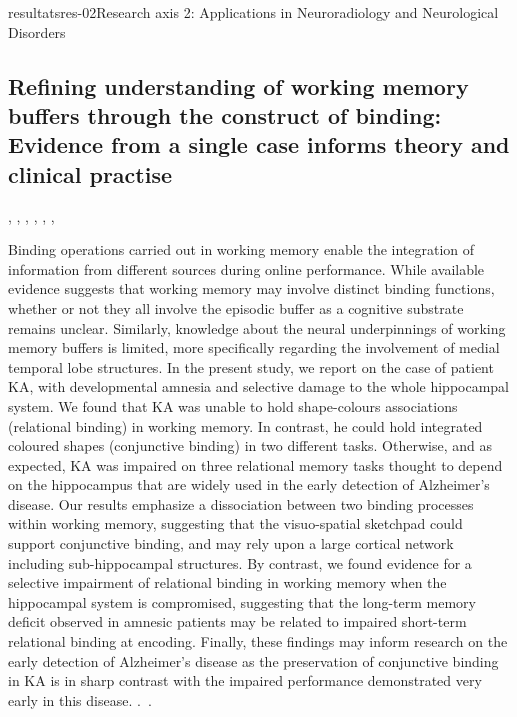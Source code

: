 \documentclass{ra2018}
\begin{document}
\begin{module}{resultats}{res-02}{Research axis 2: Applications in Neuroradiology and Neurological Disorders}
\subsection{Refining understanding of working memory buffers through the construct of binding: Evidence from a single case informs theory and clinical practise}
\begin{participants}
      , 
      ,
      ,
      ,
      ,
      ,
\end{participants}
Binding operations carried out in working memory enable the integration of information from different sources during online performance. While available evidence suggests that working memory may involve distinct binding functions, whether or not they all involve the episodic buffer as a cognitive substrate remains unclear. Similarly, knowledge about the neural underpinnings of working memory buffers is limited, more specifically regarding the involvement of medial temporal lobe structures. In the present study, we report on the case of patient KA, with developmental amnesia and selective damage to the whole hippocampal system. We found that KA was unable to hold shape-colours associations (relational binding) in working memory. In contrast, he could hold integrated coloured shapes (conjunctive binding) in two different tasks. Otherwise, and as expected, KA was impaired on three relational memory tasks thought to depend on the hippocampus that are widely used in the early detection of Alzheimer's disease. Our results emphasize a dissociation between two binding processes within working memory, suggesting that the visuo-spatial sketchpad could support conjunctive binding, and may rely upon a large cortical network including sub-hippocampal structures. By contrast, we found evidence for a selective impairment of relational binding in working memory when the hippocampal system is compromised, suggesting that the long-term memory deficit observed in amnesic patients may be related to impaired short-term relational binding at encoding. Finally, these findings may inform research on the early detection of Alzheimer's disease as the preservation of conjunctive binding in KA is in sharp contrast with the impaired performance demonstrated very early in this disease.
.~\cite{jonin:inserm-01916090}.


\end{module}
\end{document}
